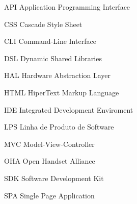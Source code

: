 \begin{siglas}
  
  \item[API] Application Programming Interface
  \item[CSS] Cascade Style Sheet
  \item[CLI] Command-Line Interface
  \item[DSL] Dynamic Shared Libraries
  \item[HAL] Hardware Abstraction Layer
  \item[HTML] HiperText Markup Language
  \item[IDE] Integrated Development Enviroment
  \item[LPS] Linha de Produto de Software
  \item[MVC] Model-View-Controller
  \item[OHA] Open Handset Alliance
  \item[SDK] Software Development Kit
  \item[SPA] Single Page Application
    
\end{siglas}
